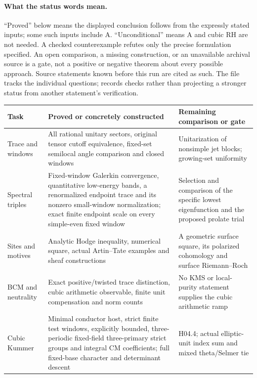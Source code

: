 \documentclass[11pt,a4paper]{article}
\theoremstyle{definition}
\theoremstyle{remark}
\begin{document}
\paragraph{What the status words mean.}
``Proved'' below means the displayed conclusion follows
from the expressly stated inputs; some such inputs include A.
``Unconditional'' means A and cubic RH are not needed.
A checked counterexample refutes only the precise
formulation specified. An open comparison, a missing
construction, or an unavailable archival source is a
gate, not a positive or negative theorem about every
possible approach. Source statements known before this
run are cited as such. The file 
tracks the individual questions; 
records checks rather than projecting a stronger status
from another statement's verification.

\begin{center}
\begin{tabular}{p{}p{}p{}}
\toprule
Task & Proved or concretely constructed & Remaining comparison or gate\\
\midrule
Trace and windows & All rational unitary sectors, original tensor
cutoff equivalence, fixed-set semilocal angle comparison and closed windows &
Unitarization of nonsimple jet blocks; growing-set uniformity\\
Spectral triples & Fixed-window Galerkin convergence, quantitative
low-energy bands, a renormalized endpoint trace and its nonzero
small-window normalization; exact finite endpoint scale on every simple-even fixed window & Selection and comparison of
the specific lowest eigenfunction and the proposed prolate trial\\
Sites and motives & Analytic Hodge inequality, numerical square,
actual Artin--Tate examples and sheaf constructions & A geometric
surface square, its polarized cohomology and surface Riemann--Roch\\
BCM and neutrality & Exact positive/twisted trace distinction, cubic
arithmetic observable, finite unit compensation and norm counts &
No KMS or local-purity statement supplies the cubic arithmetic ramp\\
Cubic Kummer & Minimal conductor host, strict finite test windows,
explicitly bounded, three-periodic fixed-field three-primary strict groups and integral CM
coefficients; full fixed-base character and determinant descent &
H04.4; actual elliptic-unit index sum and mixed theta/Selmer tie\\
\bottomrule
\end{tabular}
\end{center}
\end{document}
